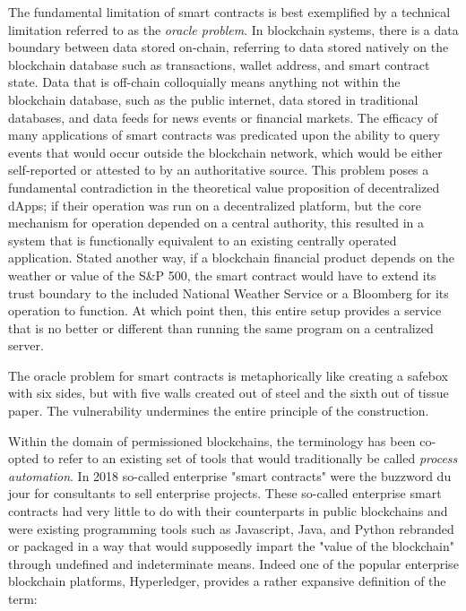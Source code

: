 The fundamental limitation of smart contracts is best exemplified by a technical
limitation referred to as the \textit{oracle problem}. In blockchain systems, there is
a data boundary between data stored on-chain, referring to data stored natively
on the blockchain database such as transactions, wallet address, and smart
contract state. Data that is off-chain colloquially means anything not within
the blockchain database, such as the public internet, data stored in traditional
databases, and data feeds for news events or financial markets. The efficacy of
many applications of smart contracts was predicated upon the ability to query
events that would occur outside the blockchain network, which would be either
self-reported or attested to by an authoritative source. This problem poses a
fundamental contradiction in the theoretical value proposition of decentralized
dApps; if their operation was run on a decentralized platform, but the core
mechanism for operation depended on a central authority, this resulted in a
system that is functionally equivalent to an existing centrally operated
application. Stated another way, if a blockchain financial product depends on
the weather or value of the S\&P 500, the smart contract would have to extend its
trust boundary to the included National Weather Service or a Bloomberg for its
operation to function. At which point then, this entire setup provides a service
that is no better or different than running the same program on a centralized
server.

The oracle problem for smart contracts is metaphorically like creating a safebox
with six sides, but with five walls created out of steel and the sixth out of
tissue paper. The vulnerability undermines the entire principle of the
construction. \cite{doctorow_inevitability_nodate}


Within the domain of permissioned blockchains, the terminology has been co-opted
to refer to an existing set of tools that would traditionally be called
\textit{process automation}. In 2018 so-called enterprise "smart contracts" were
the buzzword du jour for consultants to sell enterprise projects. These
so-called enterprise smart contracts had very little to do with their
counterparts in public blockchains and were existing programming tools such as
Javascript, Java, and Python rebranded or packaged in a way that would
supposedly impart the "value of the blockchain" through undefined and
indeterminate means. Indeed one of the popular enterprise blockchain platforms,
Hyperledger, provides a rather expansive definition of the term:
\cite{noauthor_hyperledger_2017}

